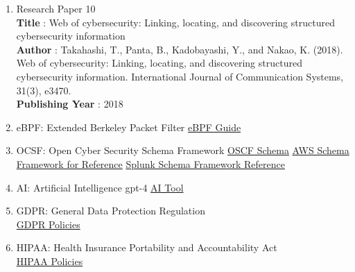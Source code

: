 \begin{enumerate}
\item Research Paper 10 
\\ \textbf{Title} : Web of cybersecurity: Linking, locating, and discovering structured cybersecurity information
\\ \textbf{Author} : Takahashi, T., Panta, B., Kadobayashi, Y., and Nakao, K. (2018). Web of cybersecurity:
Linking, locating, and discovering structured cybersecurity information. International Journal of
Communication Systems, 31(3), e3470.
\\ \textbf{Publishing Year} : 2018

\newpage
\item eBPF: Extended Berkeley Packet Filter
\newline
	\href{https://ebpf.io/books/buzzing-across-space-illustrated-childrens-guide-to-ebpf.pdf}{eBPF Guide}

\item OCSF: Open Cyber Security Schema Framework
\newline
\href{https://schema.ocsf.io/  }{OSCF Schema}
\newline
\href{https://docs.aws.amazon.com/security-lake/latest/userguide/open-cybersecurity-schema-framework.html}{AWS Schema Framework for Reference}
\newline
\href{https://www.splunk.com/en_us/blog/security/open-cybersecurity-schema-framework-ocsf-takes-flight-with-v-1-schema-release.html}{Splunk Schema Framework Reference}

\item AI: Artificial Intelligence
\newline gpt-4
\newline
\href{https://huggingface.co/TheBloke/airoboros-13b-gpt4-1.4-SuperHOT-8K-GPTQ}{AI Tool}

\item GDPR: General Data Protection Regulation
\\
\href{https://www.consilium.europa.eu/en/policies/data-protection/data-protection-regulation/#:~:text=data%20protection%20rules-,What%20is%20the%20GDPR%3F,application%20on%2025%20May%202018.}{GDPR Policies}

\item HIPAA: Health Insurance Portability and Accountability Act
\\
\href{https://www.ncbi.nlm.nih.gov/books/NBK500019/}{HIPAA Policies}
\end{enumerate}
